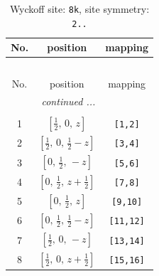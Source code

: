 \documentclass[fleqn,8pt]{jsarticle}
\begin{document}
\begin{longtable}{ccc}
\caption{Wyckoff site: {\tt 8k}, site symmetry: {\tt 2..}}
 \\
 \hline \hline
No. & position & mapping \\ \hline \endfirsthead

\multicolumn{2}{l}{\tablename\ \thetable{}} \\
 \hline \hline
No. & position & mapping \\ \hline \endhead

 \hline \hline
\multicolumn{2}{r}{\footnotesize\it continued ...} \\ \endfoot

 \hline \hline
\multicolumn{2}{r}{} \\ \endlastfoot

1 & $\left[ \frac{1}{2},\, 0,\, z \right]$ & {\tt [1,2]} \\ \hline
2 & $\left[ \frac{1}{2},\, 0,\, \frac{1}{2} - z \right]$ & {\tt [3,4]} \\ \hline
3 & $\left[ 0,\, \frac{1}{2},\, - z \right]$ & {\tt [5,6]} \\ \hline
4 & $\left[ 0,\, \frac{1}{2},\, z + \frac{1}{2} \right]$ & {\tt [7,8]} \\ \hline
5 & $\left[ 0,\, \frac{1}{2},\, z \right]$ & {\tt [9,10]} \\ \hline
6 & $\left[ 0,\, \frac{1}{2},\, \frac{1}{2} - z \right]$ & {\tt [11,12]} \\ \hline
7 & $\left[ \frac{1}{2},\, 0,\, - z \right]$ & {\tt [13,14]} \\ \hline
8 & $\left[ \frac{1}{2},\, 0,\, z + \frac{1}{2} \right]$ & {\tt [15,16]} \\
\end{longtable}
\renewcommand{\arraystretch}{1.2}
\end{document}
